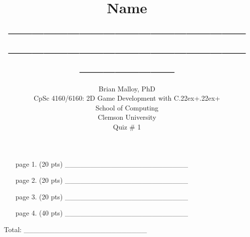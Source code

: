
\setlength{\textwidth}{6.5in}
\setlength{\textheight}{9.0in}
\evensidemargin=0in
\oddsidemargin=0in
\renewcommand{\textfloatsep}{8pt}
\topmargin=0.0in
\topskip=0pt
\renewcommand{\textfraction}{0.2}

\newcommand{\rc}[1]{Comment: \ \parbox[t]{5in}{\footnotesize\tt #1}}

\def\CPPP{C\raise.22ex\hbox{{\footnotesize +}}\raise.22ex\hbox{\footnotesize +}}
\def\CPP{C$\mkern-2mu\raise.50ex\hbox{{\tiny +}}\mkern-1mu\raise.50ex\hbox{\tiny +}$}








\baselineskip=24pt

\title{\bf Name \_\_\_\_\_\_\_\_\_\_\_\_\_\_\_\_\_\_\_\_\_\_\_\_\_\_\_\_\_\_\_\_\_\_\_\_\_\_\_\_\_\_\_\_\_\_\_\_}

\author{ Brian Malloy, PhD \\
	CpSc 4160/6160: 2D Game Development with {\CPPP} \\
        School of Computing \\
	Clemson University \\ 
	Quiz \# 1\\
}

\maketitle
\vspace*{0.5in}

\begin{enumerate}
\centering
\Large
\baselineskip=24pt

\item [page 1.]
	(20 pts) \_\_\_\_\_\_\_\_\_\_\_\_\_\_\_\_\_\_\_\_\_\_\_\_

\item [page 2.]
	(20 pts) \_\_\_\_\_\_\_\_\_\_\_\_\_\_\_\_\_\_\_\_\_\_\_\_

\item [page 3.]
	(20 pts) \_\_\_\_\_\_\_\_\_\_\_\_\_\_\_\_\_\_\_\_\_\_\_\_

\item [page 4.]
	(40 pts) \_\_\_\_\_\_\_\_\_\_\_\_\_\_\_\_\_\_\_\_\_\_\_\_

\end{enumerate}
\vspace*{0.5in}



\begin{center}
\LARGE
	Total:  \_\_\_\_\_\_\_\_\_\_\_\_\_\_\_\_\_\_\_\_\_\_\_\_
\end{center}


